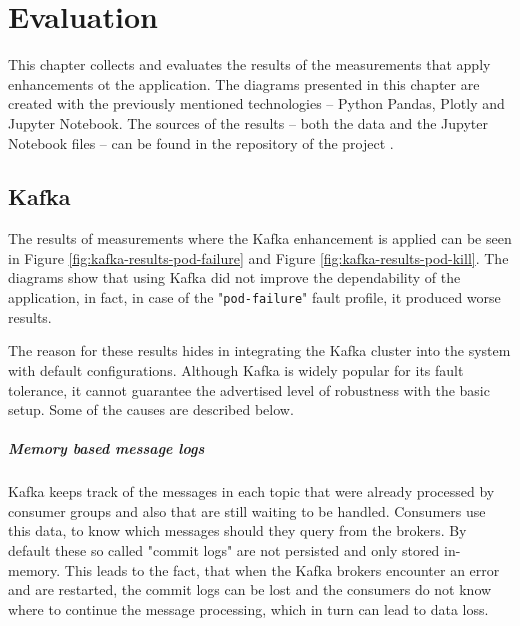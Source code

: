 \chapter{Evaluation} \label{evaluation}

This chapter collects and evaluates the results of the measurements that apply enhancements ot the application. The diagrams presented in this chapter are created with the previously mentioned technologies -- Python Pandas, Plotly and Jupyter Notebook. The sources of the results -- both the data and the Jupyter Notebook files -- can be found in the repository of the project \cite{ThesisRepoNotebook}.


\section{Kafka}

The results of measurements where the Kafka enhancement is applied can be seen in Figure \ref{fig:kafka-results-pod-failure} and Figure \ref{fig:kafka-results-pod-kill}. The diagrams show that using Kafka did not improve the dependability of the application, in fact, in case of the "\texttt{pod-failure}" fault profile, it produced worse results.

The reason for these results hides in integrating the Kafka cluster into the system with default configurations. Although Kafka is widely popular for its fault tolerance, it cannot guarantee the advertised level of robustness with the basic setup. Some of the causes are described below.

\paragraph{Memory based message logs} Kafka keeps track of the messages in each topic that were already processed by consumer groups and also that are still waiting to be handled. Consumers use this data, to know which messages should they query from the brokers. By default these so called "commit logs" are not persisted and only stored in-memory. This leads to the fact, that when the Kafka brokers encounter an error and are restarted, the commit logs can be lost and the consumers do not know where to continue the message processing, which in turn can lead to data loss.

